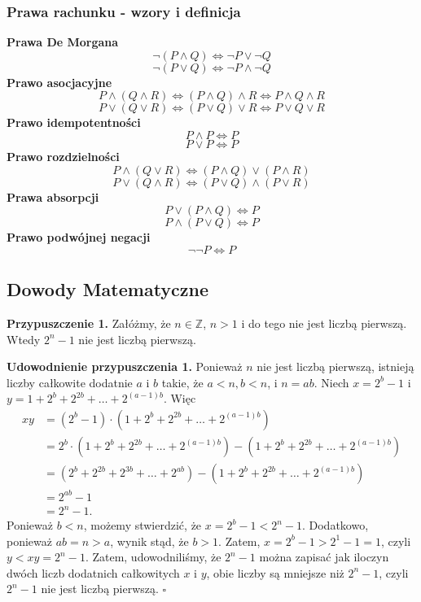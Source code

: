 \documentclass[12pt, a4paper]{article}
\begin{document}
\subsubsection*{Prawa rachunku - wzory i definicja}
\textbf{Prawa De Morgana}
$$\neg\left(P \wedge Q\right) \Leftrightarrow \neg P \vee \neg Q$$
$$\neg\left(P \vee Q\right) \Leftrightarrow \neg P \wedge \neg Q$$
\textbf{Prawo asocjacyjne}
$$P \wedge \left(Q \wedge R\right) \Leftrightarrow \left(P \wedge Q\right) \wedge R \Leftrightarrow P \wedge Q \wedge R$$
$$P \vee \left(Q \vee R\right) \Leftrightarrow \left(P \vee Q\right) \vee R \Leftrightarrow P \vee Q \vee R$$
\textbf{Prawo idempotentności}
$$P \wedge P \Leftrightarrow P$$
$$P \vee P \Leftrightarrow P$$
\textbf{Prawo rozdzielności}
$$P \wedge \left(Q \vee R\right) \Leftrightarrow \left(P \wedge Q\right) \vee \left(P \wedge R\right)$$
$$P \vee \left(Q \wedge R\right) \Leftrightarrow \left(P \vee Q\right) \wedge \left(P \vee R\right)$$
\textbf{Prawa absorpcji}
$$P \vee \left(P \wedge Q\right) \Leftrightarrow P$$
$$P \wedge \left(P \vee Q\right) \Leftrightarrow P$$
\textbf{Prawo podwójnej negacji}
$$\neg\neg P \Leftrightarrow P$$
\subsection*{Dowody Matematyczne}

\textbf{Przypuszczenie 1.} Załóżmy, że $n \in \mathbb{Z}$, $n > 1$ i do tego nie jest liczbą pierwszą.
Wtedy $2^n - 1$ nie jest liczbą pierwszą.
\vspace{1em}

\noindent \textbf{Udowodnienie przypuszczenia 1.} Ponieważ $n$ nie jest liczbą pierwszą, istnieją liczby całkowite
dodatnie $a$ i $b$ takie, że $a < n, b < n$, i $n = ab$. Niech $x = 2^b - 1$ i $y = 1 + 2^b + 2^{2b} + \dots + 2^{\left(a-1\right)b}$.
Więc
\begin{align*}
  xy &= \left(2^b -1\right) \cdot \left(1 + 2^b + 2^{2b} + \dots + 2^{\left(a - 1\right)b}\right) \\
     &= 2^b \cdot \left(1 + 2^b + 2^{2b} + \dots + 2^{\left(a-1\right)b}\right) - \left(1 + 2^b + 2^{2b} + \dots + 2^{\left(a-1\right)b}\right) \\
     &= \left(2^b + 2^{2b} + 2^{3b} + \dots + 2^{ab}\right) - \left(1 + 2^b + 2^{2b} + \dots + 2^{\left(a - 1\right)b}\right) \\
     &= 2^{ab} - 1 \\
     &= 2^n - 1.
\end{align*}
Ponieważ $b < n$, możemy stwierdzić, że $x = 2^b - 1 < 2^n - 1$. Dodatkowo, ponieważ $ab = n > a$, wynik stąd, że $b > 1$.
Zatem, $x = 2^b - 1 > 2^1 -1 = 1$, czyli $y < xy = 2^n - 1$. Zatem, udowodniliśmy, że $2^n - 1$ można zapisać jak iloczyn
dwóch liczb dodatnich całkowitych $x$ i $y$, obie liczby są mniejsze niż $2^n - 1$, czyli $2^n - 1$ nie jest liczbą pierwszą. \hfill $\square$
\end{document}
